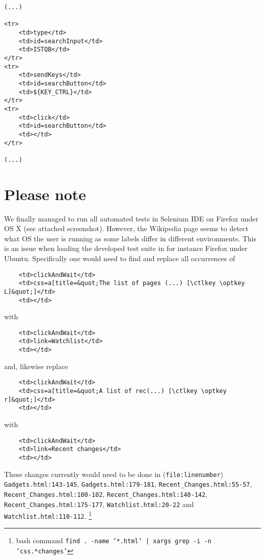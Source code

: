 \documentclass[a4paper,10pt]{article}
\begin{document}
\begin{verbatim}
(...)

<tr>
	<td>type</td>
	<td>id=searchInput</td>
	<td>ISTQB</td>
</tr>
<tr>
	<td>sendKeys</td>
	<td>id=searchButton</td>
	<td>${KEY_CTRL}</td>
</tr>
<tr>
	<td>click</td>
	<td>id=searchButton</td>
	<td></td>
</tr>

(...)
\end{verbatim}

\section*{Please note}

We finally managed to run all automated tests in Selenium IDE on Firefox under OS X (see attached screenshot). However, the Wikipedia page seems to detect what OS
the user is running as some labels differ in different environments. This is an issue when loading the developed test suite in for instance Firefox under Ubuntu. Specifically one would need 
to find and replace all occurrences of 

\begin{verbatim}
	<td>clickAndWait</td>
	<td>css=a[title=&quot;The list of pages (...) [\ctlkey \optkey L]&quot;]</td>
	<td></td>
\end{verbatim}

with

\begin{verbatim}
	<td>clickAndWait</td>
	<td>link=Watchlist</td>
	<td></td>
\end{verbatim}

and, likewise replace

\begin{verbatim}
	<td>clickAndWait</td>
	<td>css=a[title=&quot;A list of rec(...) [\ctlkey \optkey r]&quot;]</td>
	<td></td>
\end{verbatim}

with

\begin{verbatim}
	<td>clickAndWait</td>
	<td>link=Recent changes</td>
	<td></td>
\end{verbatim}

These changes currently would need to be done in (\texttt{file:linenumber}) \texttt{Gadgets.html:143-145}, \texttt{Gadgets.html:179-181}, 
\texttt{Recent\_Changes.html:55-57}, \texttt{Recent\_Changes.html:100-102}, \texttt{Recent\_Changes.html:140-142}, \texttt{Recent\_Changes.html:175-177}, 
\texttt{Watchlist.html:20-22} and \texttt{Watchlist.html:110-112}.
\footnote{bash command \texttt{find . -name '*.html' | xargs grep -i -n 'css.*changes'}}
\end{document}
